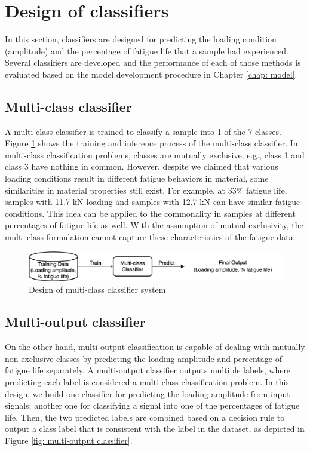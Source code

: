 \section{Design of classifiers}
\label{sec: design of classifiers}
In this section, classifiers are designed for predicting the loading condition (amplitude) and the percentage of fatigue life that a sample had experienced. Several classifiers are developed and the performance of each of those methods is evaluated based on the model development procedure in Chapter \ref{chap: model}.

\subsection{Multi-class classifier}
A multi-class classifier is trained to classify a sample into 1 of the 7 classes. Figure \ref{fig: multi-class classifier} shows the training and inference process of the multi-class classifier. In multi-class classification problems, classes are mutually exclusive, e.g., class 1 and class 3 have nothing in common. However, despite we claimed that various loading conditions result in different fatigue behaviors in material, some similarities in material properties still exist. For example, at 33\% fatigue life, samples with 11.7 kN loading and samples with 12.7 kN can have similar fatigue conditions. This idea can be applied to the commonality in samples at different percentages of fatigue life as well. With the assumption of mutual exclusivity, the multi-class formulation cannot capture these characteristics of the fatigue data.

\begin{figure}[tb]
    \centering
    \includegraphics[width=0.9\linewidth]{fig/multi-class_classifier.png}
    \caption{Design of multi-class classifier system}
    \label{fig: multi-class classifier}
\end{figure}

\subsection{Multi-output classifier}
\label{subsec: multi-output classifier}
On the other hand, multi-output classification is capable of dealing with mutually non-exclusive classes by predicting the loading amplitude and percentage of fatigue life separately. A multi-output classifier outputs multiple labels, where predicting each label is considered a multi-class classification problem. In this design, we build one classifier for predicting the loading amplitude from input signals; another one for classifying a signal into one of the percentages of fatigue life. Then, the two predicted labels are combined based on a decision rule to output a class label that is consistent with the label in the dataset, as depicted in Figure \ref{fig: multi-output classifier}. 

